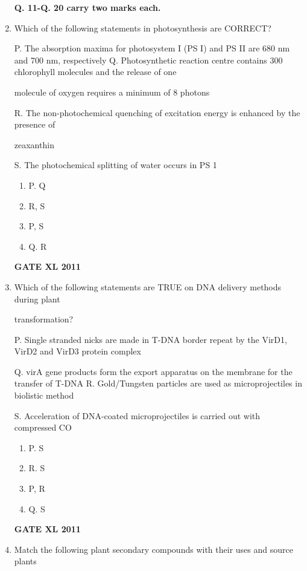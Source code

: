 \documentclass[journal,12pt,onecolumn]{IEEEtran}
\begin{document}
\begin{enumerate}
\begin{center}
\textbf{Q. 11-Q. 20 carry two marks each.}
\end{center}
\item{Which of the following statements in photosynthesis are CORRECT?

P. The absorption maxima for photosystem I (PS I) and PS II are 680 nm and 700 nm, respectively Q. Photosynthetic reaction centre contains 300 chlorophyll molecules and the release of one

molecule of oxygen requires a minimum of 8 photons

R. The non-photochemical quenching of excitation energy is enhanced by the presence of

zeaxanthin

S. The photochemical splitting of water occurs in PS 1}
		\begin{enumerate}
			\item P. Q
			\item R, S
			\item P, S
			\item Q. R
		\end{enumerate}
		\hfill{\textbf{GATE XL 2011}}

\item {Which of the following statements are TRUE on DNA delivery methods during plant

transformation?

P. Single stranded nicks are made in T-DNA border repeat by the VirD1, VirD2 and VirD3 protein complex

Q. virA gene products form the export apparatus on the membrane for the transfer of T-DNA R. Gold/Tungsten particles are used as microprojectiles in biolistic method

S. Acceleration of DNA-coated microprojectiles is carried out with compressed CO}
		\begin{enumerate}
			\item P. S
			\item R. S
			\item P, R
			\item Q. S
		\end{enumerate}
		\hfill{\textbf{GATE XL 2011}}


\item {Match the following plant secondary compounds with their uses and source plants}



\begin{minipage}{0.3\textwidth}
	\begin{flushleft}


\end{flushleft}
\end{minipage}
\end{enumerate}
\end{document}
